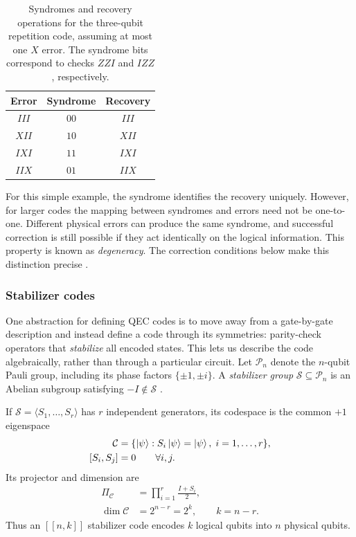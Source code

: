 \documentclass[amssymb,twocolumn,aps]{revtex4-2}
\begin{document}
\begin{table}[t]
    \centering
    \caption{Syndromes and recovery operations for the three-qubit repetition code, assuming at most one $X$ error. The syndrome bits correspond to checks $ZZI$ and $IZZ$, respectively.}
    \label{tab:three_qubit_syndromes}
    \begin{tabular}{ccc}
        \toprule
        Error & Syndrome & Recovery \\
        \midrule
        $III$ & $00$ & $III$ \\
        $XII$ & $10$ & $XII$ \\
        $IXI$ & $11$ & $IXI$ \\
        $IIX$ & $01$ & $IIX$ \\
        \bottomrule
    \end{tabular}
\end{table}

For this simple example, the syndrome identifies the recovery uniquely. However, for larger codes the mapping between syndromes and errors need not be one-to-one. Different physical errors can produce the same syndrome, and successful correction is still possible if they act identically on the logical information. This property is known as \textit{degeneracy}. The correction conditions below make this distinction precise \cite{gottesman2024surviving,terhal2015quantum}.

\subsubsection*{Stabilizer codes}

One abstraction for defining QEC codes is to move away from a gate-by-gate description and instead define a code through its symmetries: parity-check operators that \textit{stabilize} all encoded states. This lets us describe the code algebraically, rather than through a particular circuit. Let $\mathcal{P}_n$ denote the $n$-qubit Pauli group, including its phase factors $\{\pm1,\pm i\}$. A \textit{stabilizer group} $\mathcal{S}\subseteq\mathcal{P}_n$ is an Abelian subgroup satisfying $-I\notin\mathcal{S}$ \cite{gottesman1997stabilizer,gottesman2024surviving,terhal2015quantum}.

If $\mathcal{S}=\langle S_1,\ldots,S_r\rangle$ has $r$ independent generators, its codespace is the common $+1$ eigenspace
\begin{align*}
    \mathcal{C}
    &=\{\ket{\psi}: S_i\ket{\psi}=\ket{\psi},
      \;i=1,\ldots,r\},\\
    [S_i,S_j]&=0\qquad\forall i,j.
\end{align*}
Its projector and dimension are
\begin{align*}
    \Pi_{\mathcal C}
    &=\prod_{i=1}^{r}\frac{I+S_i}{2},\\
    \dim\mathcal C&=2^{n-r}=2^k,
    \qquad k=n-r.
\end{align*}
Thus an $[[n,k]]$ stabilizer code encodes $k$ logical qubits into $n$ physical qubits.
\end{document}
